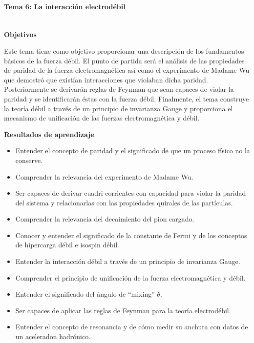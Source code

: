 \paragraph{Tema 6: La interacción electrodébil\\\\}

\textbf{Objetivos}

Este tema tiene como objetivo proporcionar una descripción de los fundamentos básicos de la fuerza débil. El punto de partida será el análisis de las propiedades de paridad de la fuerza electromagnética así como el experimento de Madame Wu que demostró que existían interacciones que violaban dicha paridad. Posteriormente se derivarán reglas de Feynman que sean capaces de violar la paridad y se identificarán éstas con la fuerza débil. Finalmente, el tema construye la teoría débil a través de un principio de invarianza Gauge y proporciona el mecanismo de unificación de las fuerzas electromagnética y débil.

\textbf{Resultados de aprendizaje}

\begin{itemize}
    \item Entender el concepto de paridad y el significado de que un proceso físico no la conserve.
    \item Comprender la relevancia del experimento de Madame Wu.
    \item Ser capaces de derivar cuadri-corrientes con capacidad para violar la paridad del sistema y relacionarlas con las propiedades quirales de las partículas.
    \item Comprender la relevancia del decaimiento del pion cargado.
    \item Conocer y entender el significado de la constante de Fermi y de los conceptos de hipercarga débil e isospin débil.
    \item Entender la interacción débil a través de un principio de invarianza Gauge.
    \item Comprender el principio de unificación de la fuerza electromagnética y débil.
    \item Entender el significado del ángulo de ``mixing'' $\theta$.
    \item Ser capaces de aplicar las reglas de Feynman para la teoría electrodébil.
    \item Entender el concepto de resonancia y de cómo medir su anchura con datos de un aceleradon hadrónico.
\end{itemize}


